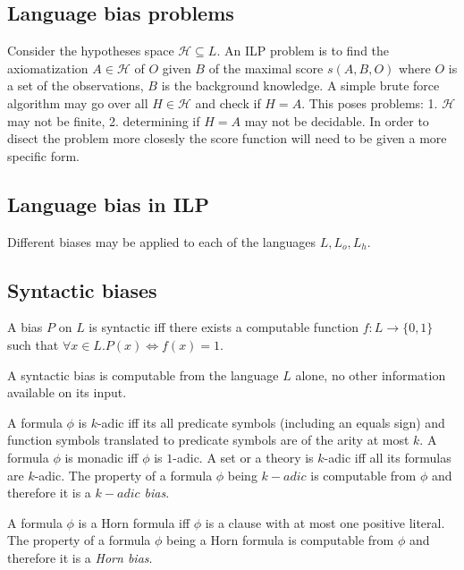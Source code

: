 \subsection{Language bias problems}
Consider the hypotheses space $\mathcal{H} \subseteq L$. An ILP problem is to find the axiomatization $A \in \mathcal{H}$ of $O$ given $B$ of the maximal score $s(A,B,O)$ where $O$ is a set of the observations, $B$ is the background knowledge.
A simple brute force algorithm may go over all $H \in \mathcal{H}$ and check if $H=A$. This poses problems:
1. $\mathcal{H}$ may not be finite,
2. determining if $H=A$ may not be decidable.
In order to disect the problem more closesly the score function will need to be given a more specific form.

\subsection{Language bias in ILP}
Different biases may be applied to each of the languages $L, L_o, L_h$. 

\subsection{Syntactic biases}

\begin{defn}
A bias $P$ on $L$ is syntactic iff there exists a computable function $f:L \to \{0,1\}$ such that $\forall x \in L.P(x) \iff f(x)=1$.
\end{defn}

\begin{remark}
A syntactic bias is computable from the language $L$ alone, no other information available on its input.
\end{remark}

\begin{defn}
A formula $\phi$ is $k$-adic iff its all predicate symbols (including an equals sign) and function symbols translated to predicate symbols are of the arity at most $k$. A formula $\phi$ is monadic iff $\phi$ is $1$-adic. A set or a theory is $k$-adic iff all its formulas are $k$-adic. The property of a formula $\phi$ being $k-adic$ is computable from $\phi$ and therefore it is a \emph{$k-adic$ bias}.
\end{defn}

\begin{defn}
A formula $\phi$ is a Horn formula iff $\phi$ is a clause with at most one positive literal. The property of a formula $\phi$ being a Horn formula is computable from $\phi$ and therefore it is a \emph{Horn bias}.
\end{defn}

